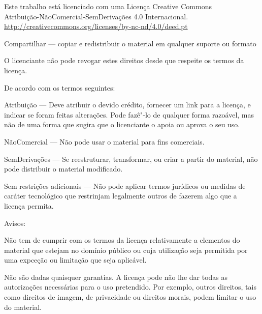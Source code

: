 \cleartorecto
\thispagestyle{plain}

\vspace*{-2\baselineskip}
\enlargethispage{\baselineskip}

{\fontsize{9}{11}\selectfont%
\setlength{\parindent}{0pt}%
\raggedright\label{copyright-details}%
\setlength{\parskip}{6pt}%

{\centering

{\LARGE\ccbyncnd}

Este trabalho está licenciado com uma Licença Creative Commons\\
Atribuição-NãoComercial-SemDerivações 4.0 Internacional.\\
\url{http://creativecommons.org/licenses/by-nc-nd/4.0/deed.pt}

}

\begin{packeditemize}
\item Compartilhar — copiar e redistribuir o material em qualquer suporte ou formato
\end{packeditemize}

O licenciante não pode revogar estes direitos desde que respeite os termos da licença.

De acordo com os termos seguintes:

\begin{packeditemize}
\item Atribuição — Deve atribuir o devido crédito, fornecer um link para a licença, e indicar se foram feitas alterações. Pode fazê"-lo de qualquer forma razoável, mas não de uma forma que sugira que o licenciante o apoia ou aprova o seu uso.
\item NãoComercial — Não pode usar o material para fins comerciais.
\item SemDerivações — Se reestruturar, transformar, ou criar a partir do material, não pode distribuir o material modificado.
\end{packeditemize}

Sem restrições adicionais — Não pode aplicar termos jurídicos ou medidas de caráter tecnológico que restrinjam legalmente outros de fazerem algo que a licença permita.

Avisos:

Não tem de cumprir com os termos da licença relativamente a elementos do material que estejam no domínio público ou cuja utilização seja permitida por uma expceção ou limitação que seja aplicável.

Não são dadas quaisquer garantias. A licença pode não lhe dar todas as autorizações necessárias para o uso pretendido. Por exemplo, outros direitos, tais como direitos de imagem, de privacidade ou direitos morais, podem limitar o uso do material.

}
